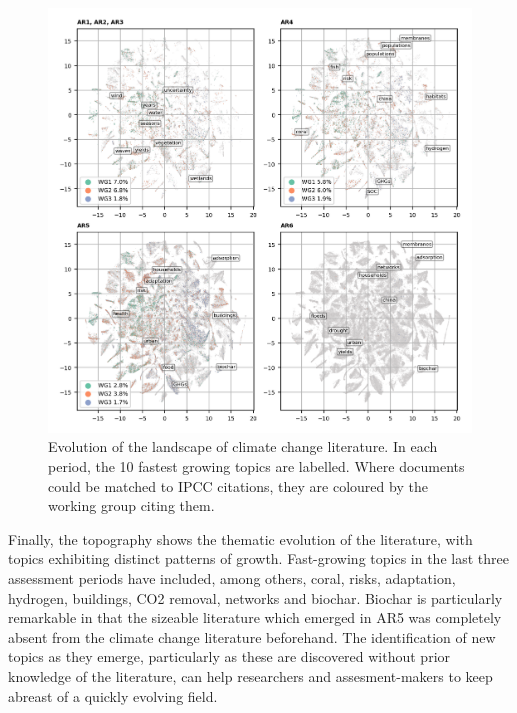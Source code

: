 \documentclass{article}
\begin{document}
\begin{linenumbers}
		
		\begin{figure}
			\begin{center}
				\includegraphics[width=180mm]{plots_pub/topic_evolution_4.png}
				\caption{Evolution of the landscape of climate change literature. In each period, the 10 fastest growing topics are labelled. Where documents could be matched to IPCC citations, they are coloured by the working group citing them.}
				\label{evolution-map}
			\end{center}
		\end{figure}
		
		Finally, the topography shows the thematic evolution of the literature, with topics exhibiting distinct patterns of growth. Fast-growing topics in the last three assessment periods have included, among others, coral, risks, adaptation, hydrogen, buildings, CO2 removal, networks and biochar. Biochar is particularly remarkable in that the sizeable literature which emerged in AR5 was completely absent from the climate change literature beforehand. 
		The identification of new topics as they emerge, particularly as these are discovered without prior knowledge of the literature, can help researchers and assesment-makers to keep abreast of a quickly evolving field.
		
		

\end{linenumbers}
\end{document}
